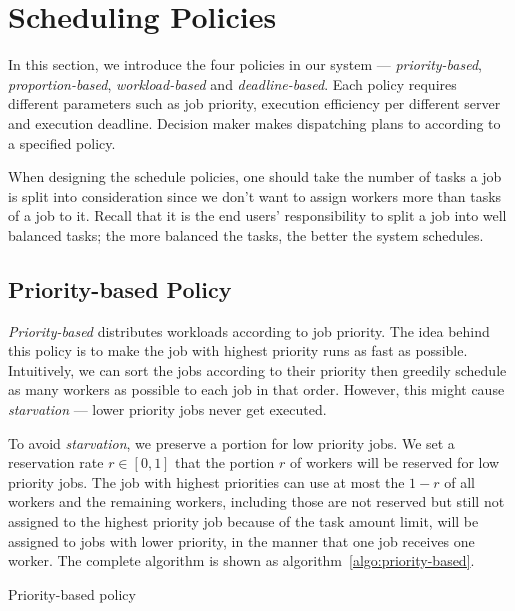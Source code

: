 \section{Scheduling Policies}\label{sec:policy}

In this section, we introduce the four policies in our system ---
\emph{priority-based}, \emph{proportion-based}, \emph{workload-based}
and \emph{deadline-based}.
Each policy requires different parameters such as job priority,
execution efficiency per different server and execution deadline.
Decision maker makes dispatching plans to according to a specified
policy.

When designing the schedule policies, one should take the number of
tasks a job is split into consideration since we don't want to assign
workers more than tasks of a job to it.
Recall that it is the end users' responsibility to split a job into well
balanced tasks; the more balanced the tasks, the better the system
schedules.


\subsection{Priority-based Policy}

\emph{Priority-based} distributes workloads according to job priority. 
The idea behind this policy is to make the job with highest priority runs as
fast as possible.
Intuitively, we can sort the jobs according to their priority then greedily
schedule as many workers as possible to each job in that order.
However, this might cause \emph{starvation} --- lower priority jobs
never get executed.


To avoid \emph{starvation}, we preserve a portion for low priority jobs.
We set a reservation rate $r \in [0,1]$ that the portion $r$ of workers
will be reserved for low priority jobs.
The job with highest priorities can use at most the $1-r$ of all workers
and the remaining workers, including those are not reserved but still not
assigned to the highest priority job because of the task amount limit,
will be assigned to jobs with lower priority, in the manner that one job
receives one worker.
The complete algorithm is shown as algorithm~\ref{algo:priority-based}.

\begin{algorithm}[H]
  
  \caption{Priority-based policy}
  \label{algo:priority-based}
\end{algorithm}

